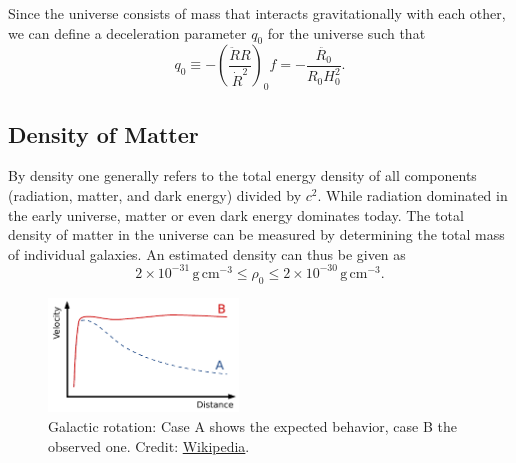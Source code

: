 Since the universe consists of mass that interacts gravitationally with each other, we can define a deceleration parameter $q_0$ for the universe such that
\begin{equation}
    \label{eqn:bbn:decceleration}
    q_0 \equiv -\left(\frac{\ddot{R} R}{\dot{R}^2}\right)_{0}f = - \frac{\ddot{R_0}}{R_0 H_0^2}.
\end{equation}


\subsection{Density of Matter}
By density one generally refers to the total energy density of all components (radiation, matter, and dark energy) divided by $c^2$. While radiation dominated in the early universe, matter or even dark energy dominates today. The total density of matter in the universe can be measured by determining the total mass of individual galaxies. An estimated density can thus be given as
\begin{equation}
    2 \times 10^{-31}\,\mathrm{g}\,\mathrm{cm}^{-3} \leq \rho_0 \leq 2\times10^{-30}\,\mathrm{g}\,\mathrm{cm}^{-3}.
\end{equation}

\begin{figure}[tb]
    \centering
    \includegraphics[width=0.45\textwidth]{graphics/bbn/galactic_rotation}
    \caption{Galactic rotation: Case A shows the expected behavior, case B the observed one. Credit: \href{https://en.wikipedia.org/wiki/Dark_matter}{Wikipedia}.}
    \label{fig:bbn:galactic_rotation}
\end{figure}



